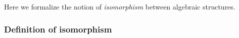 Here we formalize the notion of \emph{isomorphism} between algebraic structures.

\subsubsection{Definition of isomorphism}\label{definition-of-isomorphism}

